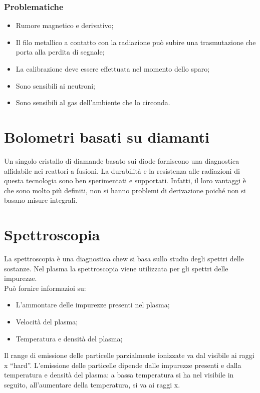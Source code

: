 \documentclass{article}
\begin{document}
\subsubsection{Problematiche}
\begin{itemize}
    \item Rumore magnetico e derivativo;
    \item Il filo metallico a contatto con la radiazione può subire una trasmutazione che porta alla perdita di segnale;
    \item La calibrazione deve essere effettuata nel momento dello sparo;
    \item Sono sensibili ai neutroni;
    \item Sono sensibili al gas dell'ambiente che lo circonda.
\end{itemize}
\section{Bolometri basati su diamanti}
Un singolo cristallo di diamande basato sui diode forniscono una diagnostica affidabile nei reattori a fusioni. La durabilità e la resistenza alle radiazioni di questa tecnologia sono ben sperimentati e supportati. Infatti, il loro vantaggi è che sono molto più definiti, non si hanno problemi di derivazione poiché non si basano misure integrali.
\section{Spettroscopia}
La spettroscopia è una diagnostica chew si basa sullo studio degli spettri delle sostanze. Nel plasma la spettroscopia viene utilizzata per gli spettri delle impurezze.\\
Può fornire informazioi su:\begin{itemize}
    \item L'ammontare delle impurezze presenti nel plasma;
    \item Velocità del plasma;
    \item Temperatura e densità del plasma;
\end{itemize}
Il range di emissione delle particelle parzialmente ionizzate va dal visibile ai raggi x ``hard''. L'emissione delle particelle dipende dalle impurezze presenti e dalla temperatura e densità del plasma: a bassa temperatura si ha nel visibile in seguito, all'aumentare della temperatura, si va ai raggi x.
\end{document}
